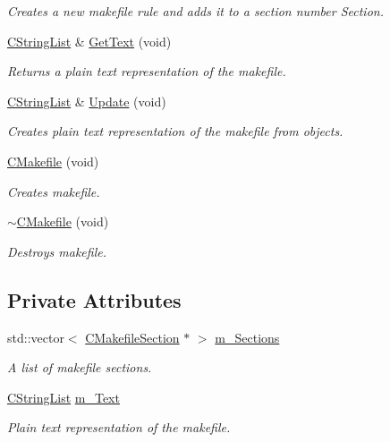 \begin{DoxyCompactItemize}
\begin{DoxyCompactList}\small\item\em Creates a new makefile rule and adds it to a section number {\itshape Section}. \end{DoxyCompactList}\item 
\hyperlink{classCStringList}{C\-String\-List} \& \hyperlink{classCMakefile_af1aad12975d83641d496caaafea4f8af}{Get\-Text} (void)
\begin{DoxyCompactList}\small\item\em Returns a plain text representation of the makefile. \end{DoxyCompactList}\item 
\hyperlink{classCStringList}{C\-String\-List} \& \hyperlink{classCMakefile_ad8e5a8c461cec5f6e41e17affe6ef2a3}{Update} (void)
\begin{DoxyCompactList}\small\item\em Creates plain text representation of the makefile from objects. \end{DoxyCompactList}\item 
\hyperlink{classCMakefile_a5fa3178a288338e66f8f3be6074351fc}{C\-Makefile} (void)
\begin{DoxyCompactList}\small\item\em Creates makefile. \end{DoxyCompactList}\item 
\hyperlink{classCMakefile_a2e0412bb037e3b09766cb55314753eb2}{$\sim$\-C\-Makefile} (void)
\begin{DoxyCompactList}\small\item\em Destroys makefile. \end{DoxyCompactList}\end{DoxyCompactItemize}
\subsection*{Private Attributes}
\begin{DoxyCompactItemize}
\item 
std\-::vector$<$ \hyperlink{classCMakefileSection}{C\-Makefile\-Section} $\ast$ $>$ \hyperlink{classCMakefile_a79350f26dda9d7a9825718956f34c3b7}{m\-\_\-\-Sections}
\begin{DoxyCompactList}\small\item\em A list of makefile sections. \end{DoxyCompactList}\item 
\hyperlink{classCStringList}{C\-String\-List} \hyperlink{classCMakefile_aee12188307be6d4ba12e877b29f7ea3d}{m\-\_\-\-Text}
\begin{DoxyCompactList}\small\item\em Plain text representation of the makefile. \end{DoxyCompactList}\end{DoxyCompactItemize}


